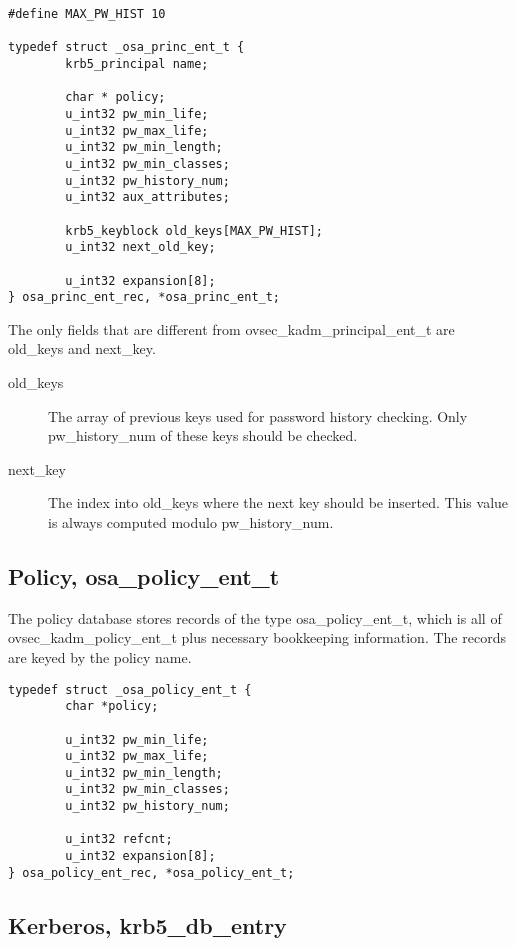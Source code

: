 \begin{verbatim}
#define MAX_PW_HIST 10

typedef struct _osa_princ_ent_t {
        krb5_principal name;

        char * policy;
        u_int32 pw_min_life;
        u_int32 pw_max_life;
        u_int32 pw_min_length;
        u_int32 pw_min_classes;
        u_int32 pw_history_num;
        u_int32 aux_attributes;

        krb5_keyblock old_keys[MAX_PW_HIST];
        u_int32 next_old_key;

        u_int32 expansion[8];
} osa_princ_ent_rec, *osa_princ_ent_t;
\end{verbatim}

The only fields that are different from ovsec_kadm_principal_ent_t are
old_keys and next_key.

\begin{description}
\item[old_keys] The array of previous keys used for password history
checking.  Only pw_history_num of these keys should be checked.

\item[next_key] The index into old_keys where the next key should be
inserted.  This value is always computed modulo pw_history_num.
\end{description}

\subsection{Policy, osa_policy_ent_t}

The policy database stores records of the type osa_policy_ent_t, which
is all of ovsec_kadm_policy_ent_t plus necessary bookkeeping
information.  The records are keyed by the policy name.

\begin{verbatim}
typedef struct _osa_policy_ent_t {
        char *policy;

        u_int32 pw_min_life;
        u_int32 pw_max_life;
        u_int32 pw_min_length;
        u_int32 pw_min_classes;
        u_int32 pw_history_num;

        u_int32 refcnt;
        u_int32 expansion[8];
} osa_policy_ent_rec, *osa_policy_ent_t;
\end{verbatim}

\subsection{Kerberos, krb5_db_entry}

